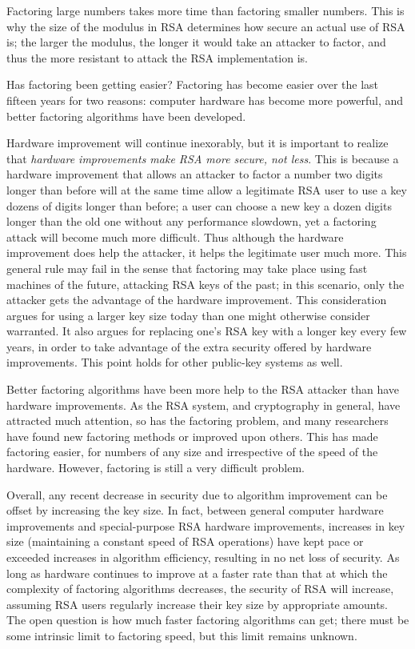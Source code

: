 Factoring large numbers takes more time than factoring smaller numbers.
This is why the size of the modulus in RSA determines how secure an 
actual use of RSA is; the larger the modulus, the longer it would take
an attacker to factor, and thus the more resistant to attack the RSA
implementation is.

{Has factoring been getting easier?}
Factoring has become easier over the last fifteen years for two reasons:
computer hardware has become more powerful, and better factoring algorithms 
have been developed. 

Hardware improvement will continue inexorably, but it is important to 
realize that {\em hardware improvements make RSA more secure, not less}.
This is because a hardware improvement that allows an attacker to factor
a number two digits longer than before will at the same time allow 
a legitimate RSA user to use a key dozens of digits longer than before; 
a user can choose a new key a dozen digits longer than the old one without
any performance slowdown, yet a factoring attack will become much more
difficult. Thus although the hardware improvement does help the attacker, 
it helps the legitimate user much more. This general rule may fail in the 
sense that factoring may take place using fast machines of the future, 
attacking RSA keys of the past; in this scenario, only the attacker gets 
the advantage of the hardware improvement. This consideration argues for 
using a larger key size today than one might otherwise consider warranted. 
It also argues for replacing one's RSA key with a longer key every few 
years, in order to take advantage of the extra security offered by hardware 
improvements. This point holds for other public-key systems as well.

Better factoring algorithms have been more help to the RSA attacker than have 
hardware improvements. As the RSA system, and cryptography in general, have 
attracted much attention, so has the factoring problem, and many researchers 
have found new factoring methods or improved upon others. This has made 
factoring easier, for numbers of any size and irrespective of the speed of 
the hardware. However, factoring is still a very difficult problem.

Overall, any recent decrease in security due to algorithm improvement can 
be offset by increasing the key size. In fact, between general computer 
hardware improvements and special-purpose RSA hardware improvements, 
increases in key size (maintaining a constant speed of RSA operations) have 
kept pace or exceeded increases in algorithm efficiency, resulting in no net 
loss of security. As long as hardware continues to improve at a faster rate 
than that at which the complexity of factoring algorithms decreases, the 
security of RSA will increase, assuming RSA users regularly increase their 
key size by appropriate amounts. The open question is how much faster 
factoring algorithms can get; there must be some intrinsic limit to 
factoring speed, but this limit remains unknown.

